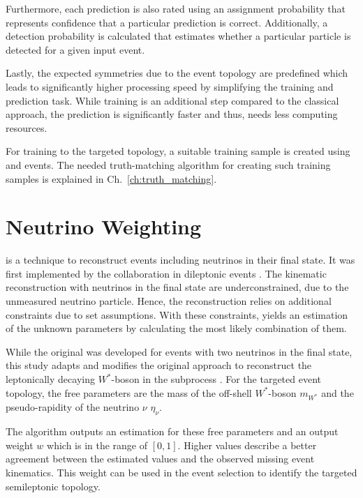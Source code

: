 \documentclass[bachelor,ngerman,english]{GAUBM}
\begin{document}
Furthermore, each prediction is also rated using an assignment probability that represents \spanets confidence that a particular prediction is correct. Additionally, a detection probability is calculated that estimates whether a particular particle is detected for a given input event. 

Lastly, the expected symmetries due to the event topology are predefined which leads to significantly higher processing speed by simplifying the training and prediction task. While training is an additional step compared to the classical approach, the prediction is significantly faster and thus, needs less computing resources.

For training \spanet to the targeted topology, a suitable training sample is created using \ttH \ttbar and \ttX events. The needed truth-matching algorithm for creating such training samples is explained in Ch.~\ref{ch:truth_matching}.


\chapter{Neutrino Weighting}
\label{ch:neutrino_weighting}
\NW is a technique to reconstruct events including neutrinos in their final state. It was first implemented by the \dzero collaboration in dileptonic \ttbar events \cite{neutrino_weighting:original}. The kinematic reconstruction with neutrinos in the final state are underconstrained, due to the unmeasured neutrino particle. Hence, the reconstruction relies on additional constraints due to set assumptions. With these constraints, \NW yields an estimation of the unknown parameters by calculating the most likely combination of them. 

While the original \NW was developed for events with two neutrinos in the final state, this study adapts and modifies the original approach to reconstruct the leptonically decaying $W^*$-boson in the \HWW subprocess \cite{neutrino_weighting:adaptation}. For the targeted event topology, the free parameters are the mass of the off-shell $W^*$-boson $m_{W^*}$ and the pseudo-rapidity of the neutrino $\nu$ $\eta_\nu$. 

The algorithm outputs an estimation for these free parameters and an output weight $w$ which is in the range of $[0,1]$. Higher values describe a better agreement between the estimated values and the observed missing event kinematics. This weight can be used in the event selection to identify the targeted semileptonic \ttHWW topology.
\end{document}
